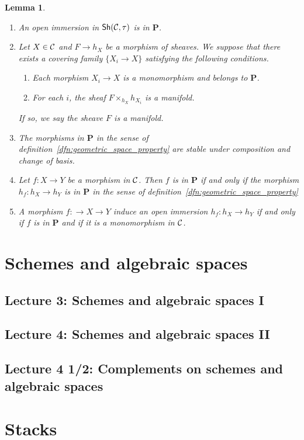 \documentclass{tufte-book} %
\numberwithin{dummy}{section}
\newtheorem{lemma}[thm]{Lemma}
\newcommand{\calc}{{\cal C}}
\newcommand{\lrta}{\longrightarrow}
\newcommand{\ssh}{\mathsf{Sh}}
\newcommand{\bfp}{\mathbf{P}}
\begin{document}
\begin{lemma}
\ 
\begin{enumerate}
\item An open immersion in $\ssh(\calc,\tau)$ is in $\bfp$.
\item Let $X\in\calc$ and $F\lrta h_X$ be a morphism of sheaves. We suppose that there exists a covering family $\{X_i\lrta X\}$ satisfying the following conditions.
\begin{enumerate}[label=(\alph*)]
\item Each morphism $X_i\lrta X$ is a monomorphism  and belongs to $\bfp$.
\item For each $i$, the sheaf $F\times_{h_X}h_{X_i}$ is a manifold.
\end{enumerate}
If so, we say the sheave $F$ is a manifold.
\item The morphisms in $\bfp$ in the sense of definition~\ref{dfn:geometric_space_property} are stable under composition and change of basis.
\item Let $f:X\lrta Y$ be  a morphism in $\calc$. Then $f$ is in $\bfp$ if and only if the morphism $h_f:h_X\lrta h_Y$ is in $\bfp$ in the sense of definition~\ref{dfn:geometric_space_property}
\item A morphism $f:\lrta X\lrta Y$ induce an open immersion $h_f:h_X\lrta h_Y$ if and only if $f$ is  in $\bfp$ and if it is a monomorphism in $\calc$.
\end{enumerate}
\end{lemma}
\chapter{Schemes and algebraic spaces}
\section{Lecture 3: Schemes and algebraic spaces I}
\section{Lecture 4: Schemes and algebraic spaces II}
\section{Lecture 4 1/2: Complements on schemes and algebraic spaces}
\chapter{Stacks}
\end{document}
